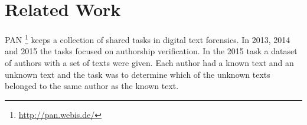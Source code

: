 \section{Related Work}

PAN \footnote{\url{http://pan.webis.de/}} keeps a collection of shared tasks in
digital text forensics. In 2013, 2014 and 2015 the tasks focused on authorship
verification. In the 2015 task a dataset of authors with a set of texts were
given. Each author had a known text and an unknown text and the task was to
determine which of the unknown texts belonged to the same author as the known
text.







